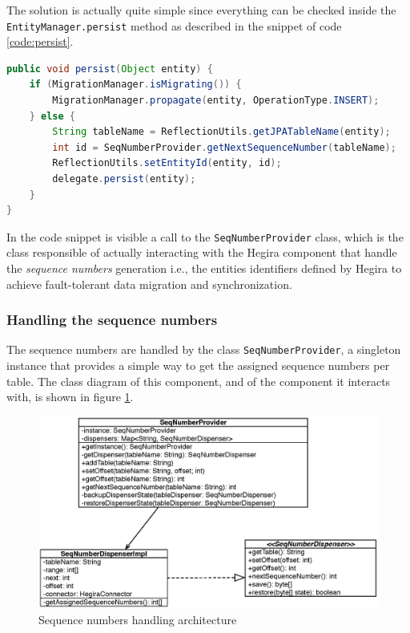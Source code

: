 \noindent The solution is actually quite simple since everything can be checked inside the \texttt{EntityManager.persist} method as described in the snippet of code \ref{code:persist}.

\begin{lstlisting}[language=Java, caption=Persist operation, label=code:persist]
public void persist(Object entity) {
    if (MigrationManager.isMigrating()) {
        MigrationManager.propagate(entity, OperationType.INSERT);
    } else {
        String tableName = ReflectionUtils.getJPATableName(entity);
        int id = SeqNumberProvider.getNextSequenceNumber(tableName);
        ReflectionUtils.setEntityId(entity, id);
        delegate.persist(entity);
    }
}
\end{lstlisting}

\noindent In the code snippet is visible a call to the  \texttt{SeqNumberProvider} class, which is the class responsible of actually interacting with the Hegira component that handle the \textit{sequence numbers} generation i.e., the entities identifiers defined by Hegira to achieve fault-tolerant data migration and synchronization. 

\subsubsection{Handling the sequence numbers}
The sequence numbers are handled by the class \texttt{SeqNumberProvider}, a singleton instance that provides a simple way to get the assigned sequence numbers per table.
\noindent The class diagram of this component, and of the component it interacts with, is shown in figure \ref{fig:seq-provider}.

\begin{figure}[tbh]
  \centering
  \includegraphics[width=12cm]{images/seq_provider}
  \caption{Sequence numbers handling architecture}
  \label{fig:seq-provider}
\end{figure} 

